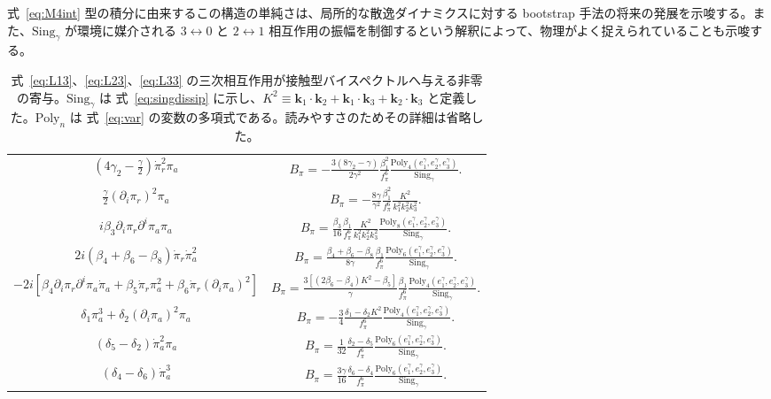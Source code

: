 \documentclass[a4paper,11pt]{ltjsarticle}
\numberwithin{equation}{section}
\def\pia{\pi_{a}}
\def\pir{\pi_{r}}
\newcommand{\boldmathsymbol}[1]{{\ensuremath{\boldsymbol{#1}}}}
\newcommand{\bmk}{\boldmathsymbol{k}}
\newcommand{\Eq}[1]{Eq.~(\ref{#1})}
\newcommand{\Eqs}[1]{Eqs.~(\ref{#1})}
\def\bmk{{\boldsymbol{k}}}
\renewcommand{\Eq}[1]{式~\eqref{#1}}
\renewcommand{\Eqs}[1]{式~\eqref{#1}}
\begin{document}
\Eq{eq:M4int} 型の積分に由来するこの構造の単純さは、局所的な散逸ダイナミクスに対する bootstrap 手法の将来の発展を示唆する。また、$\mathrm{Sing}_\gamma$ が環境に媒介される $3\leftrightarrow0$ と $2\leftrightarrow1$ 相互作用の振幅を制御するという解釈によって、物理がよく捉えられていることも示唆する。

\begin{table}
\centering
\begin{tabular}{cc}
     $\left(4 \gamma_2 -\frac{\gamma}{2} \right)  \dot{\pi}^2_{r} \pia$ & $B_\pi =  -  \frac{3\left(8 \gamma_2 - \gamma  \right)}{2\gamma^2} \frac{\beta_1^2}{f_\pi^6 } \frac{  \mathrm{Poly}_4\left(e_1^\gamma, e_2^\gamma,e_3^\gamma \right)}{ \mathrm{Sing}_\gamma} \Bigg.$ \\
    $\frac{\gamma}{2} 	\left(\partial_i \pir \right)^2 \pia $ & $B_\pi = - \frac{8\gamma}{\gamma^2} \frac{\beta_1^2}{f_\pi^6} \frac{K^2}{ k_1^2 k_2^2 k_3^2} \Bigg.$\\
    $i\beta_3 \partial_i \pir  \partial^i \pia \pia$ & $B_\pi = \frac{\beta_3}{16} \frac{\beta_1}{f_\pi^6}  \frac{K^2}{k_1^2 k_2^2 k_3^2} \frac{  \mathrm{Poly}_8\left(e_1^\gamma, e_2^\gamma,e_3^\gamma \right)}{ \mathrm{Sing}_\gamma}  \Bigg.$ \\
    $2 i\left(\beta_4 + \beta_6 - \beta_8 \right) \dot{\pi}_{r} \dot{\pi}_a^2$ & $B_\pi =   \frac{\beta_4 + \beta_6 - \beta_8}{8\gamma}  \frac{\beta_1}{f_\pi^6} \frac{  \mathrm{Poly}_6\left(e_1^\gamma, e_2^\gamma,e_3^\gamma \right)}{ \mathrm{Sing}_\gamma}  \Bigg.$  \\
    $- 2i \left[\beta_4   \partial_i \pir  \partial^i \pia \dot{\pi}_{a} +  \beta_5   \dot{\pi}_{r}  \pia^2 + \beta_6   \dot{\pi}_{r} (\partial_i \pia)^2\right]$ & $B_\pi = \frac{3\left[\left(2\beta_6 - \beta_4\right)K^2 - \beta_5\right] }{\gamma} \frac{\beta_1}{f_\pi^6}  \frac{  \mathrm{Poly}_4\left(e_1^\gamma, e_2^\gamma,e_3^\gamma \right)}{ \mathrm{Sing}_\gamma}  \Bigg.$  \\ 
    $\delta_1 \pi^3_a + \delta_2 (\partial_i \pia)^2\pia$ & $B_\pi = - \frac{3}{4} \frac{\delta_1 - \delta_2 K^2}{f_\pi^6} \frac{  \mathrm{Poly}_4\left(e_1^\gamma, e_2^\gamma,e_3^\gamma \right)}{ \mathrm{Sing}_\gamma} \Bigg.$\\
    $\left(\delta_5-\delta_2 \right)\dot{\pi}_a^2 \pia $ & $B_\pi = \frac{1}{32} \frac{\delta_2-\delta_5}{f_\pi^6} \frac{  \mathrm{Poly}_6\left(e_1^\gamma, e_2^\gamma,e_3^\gamma \right)}{ \mathrm{Sing}_\gamma} \Bigg.$\\
    $\left(\delta_4-\delta_6 \right)\dot{\pi}_a^3$ & $B_\pi = \frac{3\gamma}{16} \frac{\delta_6-\delta_4}{f_\pi^6} \frac{  \mathrm{Poly}_6\left(e_1^\gamma, e_2^\gamma,e_3^\gamma \right)}{ \mathrm{Sing}_\gamma} \Bigg.$\\
\end{tabular}
\caption{\Eqs{eq:L13}、\eqref{eq:L23}、\eqref{eq:L33} の三次相互作用が接触型バイスペクトルへ与える非零の寄与。$\mathrm{Sing}_\gamma$ は \Eq{eq:singdissip} に示し、$K^2\equiv\bmk_1\cdot\bmk_2+\bmk_1\cdot\bmk_3+\bmk_2\cdot\bmk_3$ と定義した。$\mathrm{Poly}_n$ は \Eq{eq:var} の変数の多項式である。読みやすさのためその詳細は省略した。}
\label{tab:cubicdissip}
\end{table}
\end{document}
